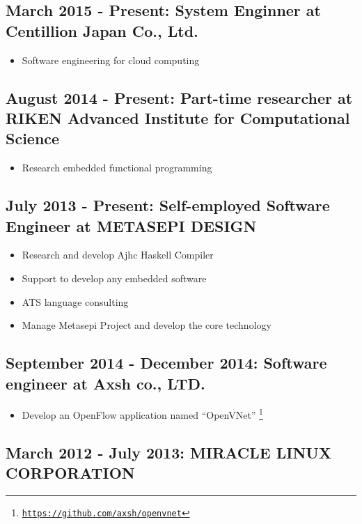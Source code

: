 \documentclass[letterpaper]{article}
\begin{document}
\subsection*{March 2015 - Present: System Enginner at Centillion Japan Co., Ltd.}

\begin{itemize}
  \item Software engineering for cloud computing
\end{itemize}

\subsection*{August 2014 - Present: Part-time researcher at RIKEN Advanced Institute for Computational Science}

\begin{itemize}
  \item Research embedded functional programming
\end{itemize}

\subsection*{July 2013 - Present: Self-employed Software Engineer at METASEPI DESIGN}

\begin{itemize}
  \item Research and develop Ajhc Haskell Compiler
  \item Support to develop any embedded software
  \item ATS language consulting
  \item Manage Metasepi Project and develop the core technology
\end{itemize}

\subsection*{September 2014 - December 2014: Software engineer at Axsh co., LTD.}

\begin{itemize}
  \item Develop an OpenFlow application named ``OpenVNet'' \footnote{\href{https://github.com/axsh/openvnet}{\tt https://github.com/axsh/openvnet}}
\end{itemize}

\subsection*{March 2012 - July 2013: MIRACLE LINUX CORPORATION}
\end{document}
